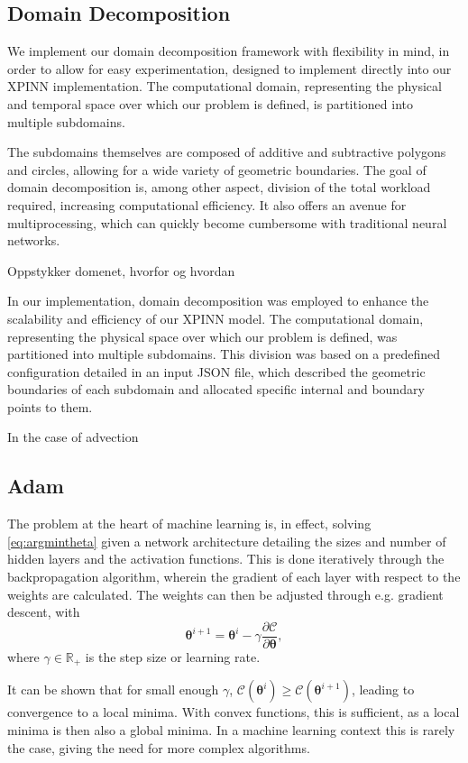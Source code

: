 \subsection{Domain Decomposition}
We implement our domain decomposition framework with flexibility in mind, in order to allow for easy experimentation, designed to implement directly into our XPINN implementation.
The computational domain, representing the physical and temporal space over which our problem is defined, is partitioned into multiple subdomains.

The subdomains themselves are composed of additive and subtractive polygons and circles, allowing for a wide variety of geometric boundaries.
The goal of domain decomposition is, among other aspect, division of the total workload required, increasing computational efficiency.
It also offers an avenue for multiprocessing, which can quickly become cumbersome with traditional neural networks.


Oppstykker domenet, hvorfor og hvordan

In our implementation, domain decomposition was employed to enhance the scalability and efficiency of our XPINN model. The computational domain, representing the physical space over which our problem is defined, was partitioned into multiple subdomains. This division was based on a predefined configuration detailed in an input JSON file, which described the geometric boundaries of each subdomain and allocated specific internal and boundary points to them.

In the case of advection

\subsection{Adam}
The problem at the heart of machine learning is, in effect, solving \autoref{eq:argmintheta} given a network architecture detailing the sizes and number of hidden layers and the activation functions.
This is done iteratively through the backpropagation algorithm, wherein the gradient of each layer with respect to the weights are calculated.
The weights can then be adjusted through e.g. gradient descent, with
\begin{equation}\label{eq:backprop}
    \boldsymbol{\theta}^{i+1} = \boldsymbol{\theta}^i - \gamma \frac{\partial \mathcal{C}}{\partial \boldsymbol{\theta}},
\end{equation}
where $\gamma \in \mathbb{R}_{+}$ is the step size or learning rate.

It can be shown that for small enough $\gamma$, $\mathcal{C}(\boldsymbol{\theta}^i) \geq \mathcal{C}(\boldsymbol{\theta}^{i+1})$, leading to convergence to a local minima.
With convex functions, this is sufficient, as a local minima is then also a global minima.
In a machine learning context this is rarely the case, giving the need for more complex algorithms.

